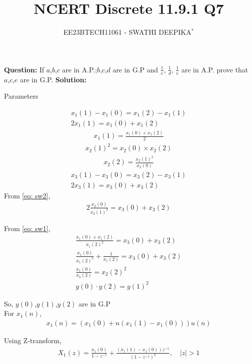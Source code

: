 \documentclass[journal,12pt,twocolumn]{IEEEtran}
\title{
	
\title{NCERT Discrete 11.9.1 Q7}
\author{EE23BTECH11061 - SWATHI DEEPIKA$^{*}$%
}


}
\theoremstyle{remark}
\newcommand{\solution}{\noindent \textbf{Solution: }}
\begin{document}
\maketitle

\textbf{Question:} 
If $a$,$b$,$c$ are in A.P.;$b$,$c$,$d$ are in G.P and $\frac{1}{c}$, $\frac{1}{d}$, $\frac{1}{e}$ are in A.P. prove that $a$,$c$,$e$ are in G.P.
\solution
 \begin{table}[h]
 	\centering
 	\resizebox{6 cm}{!}{
 		
 	}
 	\vspace{6 pt}
 	\caption{Parameters}
 	\label{tab:swa_tabel} 
 \end{table}

 
\begin{align}
x_1(1)-x_1(0) = x_1(2)-x_1(1)\\
2x_1(1)=x_1(0)+x_1(2) \label{eq: sw1}
\end{align}
\begin{align}
x_1(1)=\frac{x_1(0)+x_1(2)}{2} 
\end{align}
\begin{align}
x_2(1)^2 = x_2(0)\times x_2(2)
\end{align}
\begin{align}
x_2(2)= \frac{{x_2(1)}^2}{x_2(0)} \label{eq: sw2}
\end{align}
\begin{align}
x_3(1) - x_3(0) = x_3(2) - x_3(1)\\
2{x_3(1)} = x_3(0) + x_3(2)
\end{align}
From \eqref{eq: sw2},
\begin{align}
2\frac{x_2(0)}{x_2(1)^2} = x_3(0) + x_3(2)
\end{align}

From \eqref{eq: sw1},
\begin{align}\frac{x_1(0) + x_1(2)}{{x_1(2)}^2} = x_3(0) + x_3(2)\\
\frac{x_1(0)}{{x_1(2)}^2} + \frac{1}{x_1(2)} = x_3(0) + x_3(2)\\
\frac{x_1(0)}{x_3(2)} = {x_2(2)}^2\\
y(0) \cdot y(2) = {y(1)}^2
\end{align}

So, $y(0)$,$y(1)$,$y(2)$ are in G.P\\


For $x_1(n)$,
\begin{align}
x_1(n) = (x_1(0) + n(x_1(1)-x_1(0)))u(n)
\end{align}

Using Z-transform, 
\begin{align}
X_1(z) = \frac{x_1(0)}{1-z^{-1}} + \frac{(x_1(1)-x_1(0))z^{-1}}{(1-z^{-1})^2} ,
\quad |z| > 1
\end{align}
\end{document}
